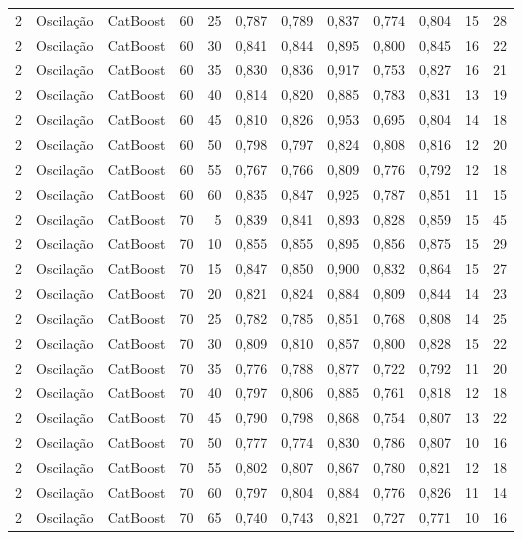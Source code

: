 \begin{longtable}{ccclrrrrrrrr}
2 & Oscilação & CatBoost & 60 & 25 & 0,787 & 0,789 & 0,837 & 0,774 & 0,804 & 15 & 28 \\
2 & Oscilação & CatBoost & 60 & 30 & 0,841 & 0,844 & 0,895 & 0,800 & 0,845 & 16 & 22 \\
2 & Oscilação & CatBoost & 60 & 35 & 0,830 & 0,836 & 0,917 & 0,753 & 0,827 & 16 & 21 \\
2 & Oscilação & CatBoost & 60 & 40 & 0,814 & 0,820 & 0,885 & 0,783 & 0,831 & 13 & 19 \\
2 & Oscilação & CatBoost & 60 & 45 & 0,810 & 0,826 & 0,953 & 0,695 & 0,804 & 14 & 18 \\
2 & Oscilação & CatBoost & 60 & 50 & 0,798 & 0,797 & 0,824 & 0,808 & 0,816 & 12 & 20 \\
2 & Oscilação & CatBoost & 60 & 55 & 0,767 & 0,766 & 0,809 & 0,776 & 0,792 & 12 & 18 \\
2 & Oscilação & CatBoost & 60 & 60 & 0,835 & 0,847 & 0,925 & 0,787 & 0,851 & 11 & 15 \\
2 & Oscilação & CatBoost & 70 & 5 & 0,839 & 0,841 & 0,893 & 0,828 & 0,859 & 15 & 45 \\
2 & Oscilação & CatBoost & 70 & 10 & 0,855 & 0,855 & 0,895 & 0,856 & 0,875 & 15 & 29 \\
2 & Oscilação & CatBoost & 70 & 15 & 0,847 & 0,850 & 0,900 & 0,832 & 0,864 & 15 & 27 \\
2 & Oscilação & CatBoost & 70 & 20 & 0,821 & 0,824 & 0,884 & 0,809 & 0,844 & 14 & 23 \\
2 & Oscilação & CatBoost & 70 & 25 & 0,782 & 0,785 & 0,851 & 0,768 & 0,808 & 14 & 25 \\
2 & Oscilação & CatBoost & 70 & 30 & 0,809 & 0,810 & 0,857 & 0,800 & 0,828 & 15 & 22 \\
2 & Oscilação & CatBoost & 70 & 35 & 0,776 & 0,788 & 0,877 & 0,722 & 0,792 & 11 & 20 \\
2 & Oscilação & CatBoost & 70 & 40 & 0,797 & 0,806 & 0,885 & 0,761 & 0,818 & 12 & 18 \\
2 & Oscilação & CatBoost & 70 & 45 & 0,790 & 0,798 & 0,868 & 0,754 & 0,807 & 13 & 22 \\
2 & Oscilação & CatBoost & 70 & 50 & 0,777 & 0,774 & 0,830 & 0,786 & 0,807 & 10 & 16 \\
2 & Oscilação & CatBoost & 70 & 55 & 0,802 & 0,807 & 0,867 & 0,780 & 0,821 & 12 & 18 \\
2 & Oscilação & CatBoost & 70 & 60 & 0,797 & 0,804 & 0,884 & 0,776 & 0,826 & 11 & 14 \\
2 & Oscilação & CatBoost & 70 & 65 & 0,740 & 0,743 & 0,821 & 0,727 & 0,771 & 10 & 16 \\

\end{longtable}

